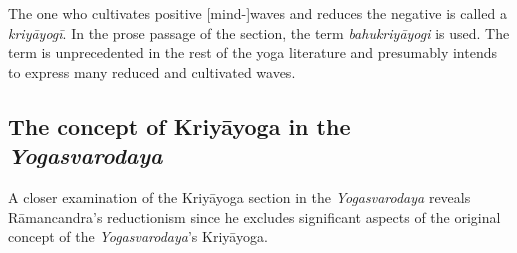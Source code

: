 The one who cultivates positive [mind-]waves and reduces the negative is called a \textit{kriyāyogī}. In the prose passage of the section, the term \textit{bahukriyāyogi} is used. The term is unprecedented in the rest of the yoga literature and presumably intends to express many reduced and cultivated waves.

\subsection{The concept of Kriyāyoga in the \textit{Yogasvarodaya}}
A closer examination of the Kriyāyoga section in the \textit{Yogasvarodaya} reveals Rāmancandra's reductionism since he excludes significant aspects of the original concept of the \textit{Yogasvarodaya}'s Kriyāyoga.


